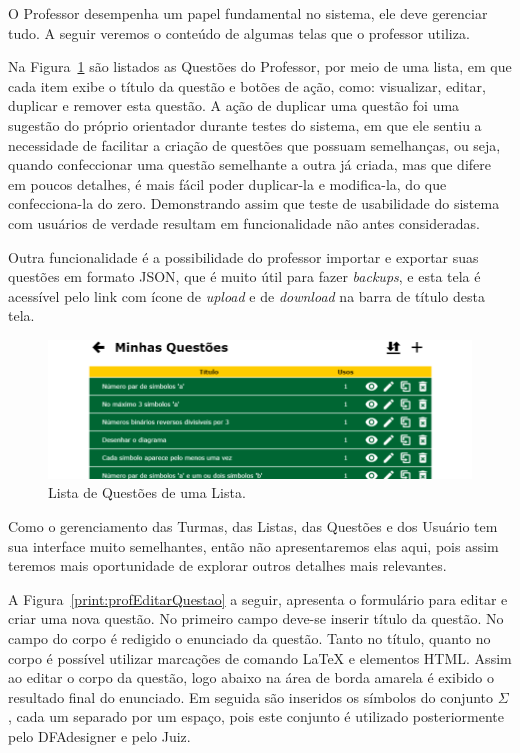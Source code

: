 \documentclass[
	12pt,				%
	openany,
	oneside,
	a4paper,			%
	english,			%
	brazil				%
	]{abntex2}
\begin{document}
  O Professor desempenha um papel fundamental no sistema, ele deve gerenciar tudo. A seguir veremos o conteúdo de algumas telas que o professor utiliza.
  
  Na Figura~\ref{print:profQuestoes} são listados as Questões do Professor, por meio de uma lista, em que cada item exibe o título da questão e botões de ação, como: visualizar, editar, duplicar e remover esta questão. A ação de duplicar uma questão foi uma sugestão do próprio orientador durante testes do sistema, em que ele sentiu a necessidade de facilitar a criação de questões que possuam semelhanças, ou seja, quando confeccionar uma questão semelhante a outra já criada, mas que difere em poucos detalhes, é mais fácil poder duplicar-la e modifica-la, do que confecciona-la do zero. Demonstrando assim que teste de usabilidade do sistema com usuários de verdade resultam em funcionalidade não antes consideradas. 
  
  Outra funcionalidade é a possibilidade do professor importar e exportar suas questões em formato JSON, que é muito útil para fazer \textit{backups}, e esta tela é acessível pelo link com ícone de \textit{upload} e de \textit{download} na barra de título desta tela.
        
\begin{figure}[H]
  \centering
  \includegraphics[width=\textwidth]{prints/profQuestoes.png}
  \caption{Lista de Questões de uma Lista.}
  \label{print:profQuestoes}
  \vspace{-0.5cm}
\end{figure}

  Como o gerenciamento das Turmas, das Listas, das Questões e dos Usuário tem sua interface muito semelhantes, então não apresentaremos elas aqui, pois assim teremos mais oportunidade de explorar outros detalhes mais relevantes.
  
  A Figura~\ref{print:profEditarQuestao} a seguir, apresenta o formulário para editar e criar uma nova questão. No primeiro campo deve-se inserir título da questão. No campo do corpo é redigido o enunciado da questão. Tanto no título, quanto no corpo é possível utilizar marcações de comando \LaTeX\xspace e elementos HTML. Assim ao editar o corpo da questão, logo abaixo na área de borda amarela é exibido o resultado final do enunciado. Em seguida são inseridos os símbolos do conjunto $\Sigma$, cada um separado por um espaço, pois este conjunto é utilizado posteriormente pelo DFAdesigner e pelo Juiz. 
  
\end{document}
